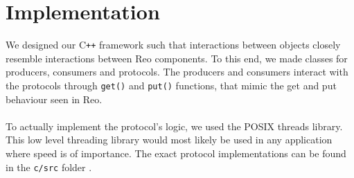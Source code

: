 \section{Implementation}

We designed our C\texttt{++} framework such that interactions between objects closely resemble interactions between Reo components. To this end, we made classes for producers, consumers and protocols. The producers and consumers interact with the protocols through \verb|get()| and \verb|put()| functions, that mimic the get and put behaviour seen in Reo.\\\\
%
To actually implement the protocol's logic, we used the POSIX threads library\cite{pthreads}. This low level threading library would most likely be used in any application where speed is of importance. The exact protocol implementations can be found in the \verb|c/src| folder \cite{us:git}.
